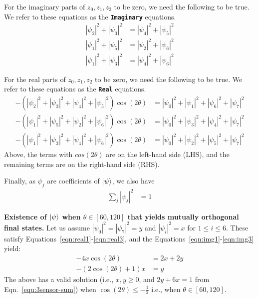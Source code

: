 \begin{prf}
For the imaginary parts of $z_0, z_1, z_2$ to be zero, we need the following to be true. We refer to these equations as the \texttt{\textbf{Imaginary}} equations.
\begin{align}
    |\psi_2|^{2} + |\psi_3|^{2} &= |\psi_4|^{2} + |\psi_5|^{2} \label{eqn:real1}\\
    |\psi_1|^{2} + |\psi_5|^{2} &= |\psi_2|^{2} + |\psi_6|^{2}\\
    |\psi_1|^{2} + |\psi_3|^{2} &= |\psi_4|^{2} + |\psi_6|^{2} \label{eqn:real3}
\end{align}

For the real parts of $z_0, z_1, z_2$ to be zero, we need the following to be true. We refer to these equations as the \texttt{\textbf{Real}} equations.
\begin{align}
   -(|\psi_2|^{2} + |\psi_3|^{2} + |\psi_4|^{2}+ |\psi_5|^{2})\cos(2\theta) &=   |\psi_0|^{2} + |\psi_1|^{2} + |\psi_6|^{2}+ |\psi_7|^{2} \label{eqn:img1} \\
   -(|\psi_1|^{2} + |\psi_5|^{2} + |\psi_2|^{2}+ |\psi_6|^{2})\cos(2\theta) &=   |\psi_0|^{2} + |\psi_3|^{2} + |\psi_4|^{2}+ |\psi_7|^{2} \\
   -(|\psi_1|^{2} + |\psi_3|^{2} + |\psi_4|^{2}+ |\psi_6|^{2})\cos(2\theta) &=   |\psi_0|^{2} + |\psi_2|^{2} + |\psi_5|^{2}+ |\psi_7|^{2} \label{eqn:img3}
\end{align}
Above, the terms with $cos(2\theta)$ are on the left-hand side (LHS), and the remaining
terms are on the right-hand side (RHS).

\noindent
Finally, as $\psi_j$ are coefficients of $\ket{\psi}$, we also have
\begin{align}
\sum_j |\psi_j|^{2} &= 1  \label{equ:3sensor-sum}
\end{align}

\medskip
\noindent
{\bf Existence of $\ket{\psi}$ when $\theta \in [60, 120]$ that yields mutually orthogonal final states.} 
Let us assume 
$|\psi_0|^2 = |\psi_7|^2 = y$ and $|\psi_i|^2 = x$ for $1 \leq i \leq 6$. 
These satisfy Equations~\ref{eqn:real1}-\ref{eqn:real3}, and the Equations~\ref{eqn:img1}-\ref{eqn:img3} yield: 
\begin{align}
    -4x\cos(2\theta) &= 2x + 2y  \nonumber \\
    -(2\cos(2\theta) + 1)x &= y  \nonumber
\end{align}
The above has a valid solution (i.e., $x, y \geq 0$, and $2y + 6x = 1$ from
Eqn.~\ref{equ:3sensor-sum}) when 
$\cos(2\theta) \leq -\frac{1}{2}$ i.e., when $\theta \in [60, 120]$.


\end{prf}
